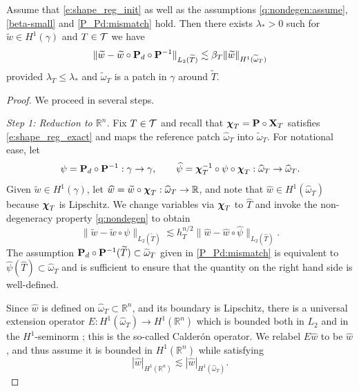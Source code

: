 \begin{proposition}\label{l:convolution}
Assume that \eqref{e:shape_reg_init} as well as the assumptions
\eqref{q:nondegen:assume}, \eqref{beta-small} and \eqref{P_Pd:mismatch} hold.
Then there exists $\lambda_* >0$ such for $\widetilde{w} \in H^1(\gamma)$ and $T \in \mathcal{T}$ we have
$$
\| \widetilde w - \widetilde w \circ {\bf P}_d \circ {\bf P}^{-1} \|_{L_2(\widetilde T)} \lesssim \beta_T \| \widetilde w \|_{H^1(\widetilde \omega_T)}
$$
provided $\lambda_T \leq \lambda_*$ and $\widetilde \omega_T$ is a patch in
$\gamma$ around $\widetilde{T}$.
\end{proposition}
%
\begin{proof}
We proceed in several steps.

\noindent
{\it Step 1: Reduction to $\mathbb{R}^n$.}
Fix $T \in \mathcal{T}$ and recall that ${\boldsymbol \chi}_T = {\bf P} \circ {\bf X}_T$ satisfies
\eqref{e:shape_reg_exact} and maps the reference patch $\widehat{\omega}_T$
into $\widetilde{\omega}_T$. For notational ease, let
%
\[
\psi={\bf P}_d \circ {\bf P}^{-1}:\gamma\to\gamma,
\qquad
\widehat{\psi}={\boldsymbol \chi}_T^{-1} \circ \psi \circ {\boldsymbol \chi}_T:\widehat{\omega}_T\to\widehat{\omega}_T.
\]
%
Given $\widetilde{w} \in H^1(\gamma)$, let
$\widehat{w}=\widetilde{w} \circ {\boldsymbol \chi}_T:\widehat{\omega}_T\to\mathbb{R}$,
and note that $\widehat{w}\in H^1(\widehat{\omega}_T)$ because ${\boldsymbol \chi}_T$ is Lipschitz.
We change variables via ${\boldsymbol \chi}_T$ to $\widehat{T}$ and invoke the non-degeneracy
property \eqref{q:nondegen} to obtain
%
\[
\|\widetilde{w}-\widetilde{w}\circ \psi\|_{L_2(\widetilde{T})}
\lesssim h_T^{n/2} \|\widehat{w}-\widehat{w} \circ \widehat{\psi}\|_{L_2(\widehat{T})}.
\]
%
The assumption ${\bf P}_d \circ {\bf P}^{-1} (\widetilde{T}) \subset \widetilde{\omega}_T$ given in \eqref{P_Pd:mismatch} is equivalent to $\widehat{\psi}(\widehat{T}) \subset \widehat{\omega}_T$ and is sufficient to ensure that the quantity on the right hand side is well-defined.

Since $\widehat{w}$ is defined on $\widehat{\omega}_T\subset\mathbb{R}^n$, and
its boundary is Lipschitz, there is a universal extension operator
$E:H^1(\widehat{\omega}_T)\to H^1(\mathbb{R}^n)$ which is bounded both in $L_2$ and in the $H^1$-seminorm \cite{Stein:70}; this is the so-called Calder\'on operator. 
We relabel $E \widehat{w}$ to be $\widehat{w}$, and thus assume it is bounded in
$H^1(\mathbb{R}^n)$ while satisfying
%
\[
|\widehat{w}|_{H^1(\mathbb{R}^n)} \lesssim |\widehat{w}|_{H^1(\widehat{\omega}_T)}.
\]



\end{proof}

